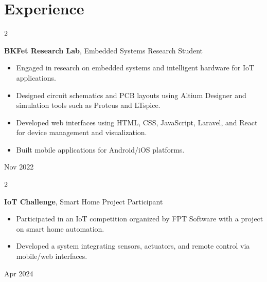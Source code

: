 \documentclass[10pt, letterpaper]{article}
\newenvironment{highlights}{
    \begin{itemize}[
        topsep=0.10 cm,
        parsep=0.10 cm,
        partopsep=0pt,
        itemsep=0pt,
        leftmargin=0.4 cm + 10pt
    ]
}{
    \end{itemize}
} %
\newenvironment{twocolentry}[2][]{
    \onecolentry
    \def\secondColumn{#2}
    \setcolumnwidth{\fill, 4.5 cm}
    \begin{paracol}{2}
}{
    \switchcolumn \raggedleft \secondColumn
    \end{paracol}
    \endonecolentry
} %
\begin{document}
    \section{Experience}
        \begin{twocolentry}{
            Nov 2022 
        }
            \textbf{BKFet Research Lab}, Embedded Systems Research Student
            \begin{highlights}
                \item Engaged in research on embedded systems and intelligent hardware for IoT applications.
                \item Designed circuit schematics and PCB layouts using Altium Designer and simulation tools such as Proteus and LTspice.
                \item Developed web interfaces using HTML, CSS, JavaScript, Laravel, and React for device management and visualization.
                \item Built mobile applications for Android/iOS platforms.
            \end{highlights}
        \end{twocolentry}
        \vspace{0.2 cm}
        \begin{twocolentry}{
            Apr 2024
        }
            \textbf{IoT Challenge}, Smart Home Project Participant
            \begin{highlights}
                \item Participated in an IoT competition organized by FPT Software with a project on smart home automation.
                \item Developed a system integrating sensors, actuators, and remote control via mobile/web interfaces.
            \end{highlights}
        \end{twocolentry}

   
\end{document}
